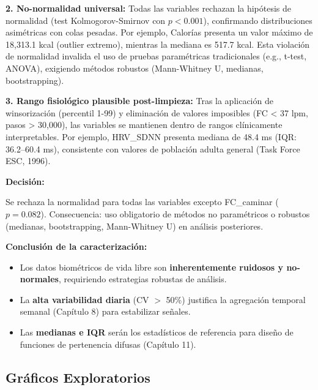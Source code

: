 \documentclass[12pt,letterpaper,twoside]{report}
\begin{document}
\textbf{2. No-normalidad universal:} Todas las variables rechazan la hipótesis de normalidad (test Kolmogorov-Smirnov con $p < 0.001$), confirmando distribuciones asimétricas con colas pesadas. Por ejemplo, Calorías presenta un valor máximo de 18,313.1 kcal (outlier extremo), mientras la mediana es 517.7 kcal. Esta violación de normalidad invalida el uso de pruebas paramétricas tradicionales (e.g., t-test, ANOVA), exigiendo métodos robustos (Mann-Whitney U, medianas, bootstrapping).

\textbf{3. Rango fisiológico plausible post-limpieza:} Tras la aplicación de winsorización (percentil 1-99) y eliminación de valores imposibles (FC < 37 lpm, pasos > 30,000), las variables se mantienen dentro de rangos clínicamente interpretables. Por ejemplo, HRV\_SDNN presenta mediana de 48.4 ms (IQR: 36.2--60.4 ms), consistente con valores de población adulta general (Task Force ESC, 1996).

\begin{decisionbox}
\textbf{Decisión:}

Se rechaza la normalidad para todas las variables excepto FC\_caminar ($p=0.082$). Consecuencia: uso obligatorio de métodos no paramétricos o robustos (medianas, bootstrapping, Mann-Whitney U) en análisis posteriores.
\end{decisionbox}

\begin{conclusionbox}
\textbf{Conclusión de la caracterización:}

\begin{itemize}[noitemsep]
    \item Los datos biométricos de vida libre son \textbf{inherentemente ruidosos y no-normales}, requiriendo estrategias robustas de análisis.
    \item La \textbf{alta variabilidad diaria} (CV $>$ 50\%) justifica la agregación temporal semanal (Capítulo 8) para estabilizar señales.
    \item Las \textbf{medianas e IQR} serán los estadísticos de referencia para diseño de funciones de pertenencia difusas (Capítulo 11).
\end{itemize}
\end{conclusionbox}

\subsection{Gráficos Exploratorios}
\end{document}

